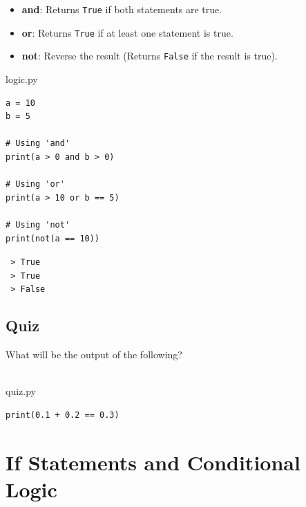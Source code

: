 \documentclass{report}
\begin{document}
\begin{itemize}
    \item \textbf{and}: Returns \texttt{True} if both statements are true.
    \item \textbf{or}: Returns \texttt{True} if at least one statement is true.
    \item \textbf{not}: Reverse the result (Returns \texttt{False} if the result is true).
\end{itemize}

\begin{vscode}{logic.py}
\begin{lstlisting}[style=vscodeStyle]
a = 10
b = 5

# Using 'and'
print(a > 0 and b > 0) 

# Using 'or'
print(a > 10 or b == 5) 

# Using 'not'
print(not(a == 10)) 
\end{lstlisting}
\end{vscode}

\begin{terminal}
\texttt{\color{terminalFont} > True}\\
\texttt{\color{terminalFont} > True}\\
\texttt{\color{terminalFont} > False}\\
\end{terminal}

\subsection*{Quiz}
What will be the output of the following?
\\\\
\begin{vscode}{quiz.py}
\begin{lstlisting}[style=vscodeStyle]
print(0.1 + 0.2 == 0.3)
\end{lstlisting}
\end{vscode}

\section{If Statements and Conditional Logic}
\end{document}
